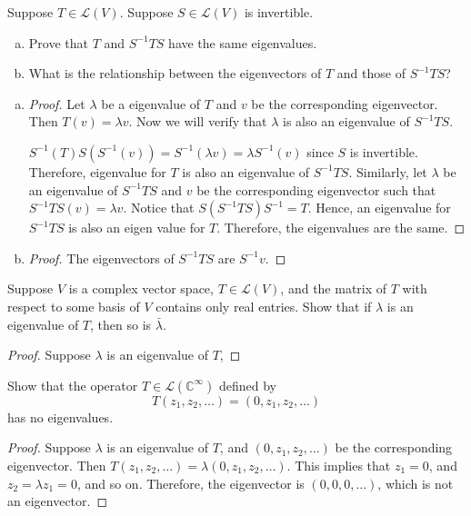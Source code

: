 \begin{exercise}
Suppose $T \in \mathcal{L}(V)$. Suppose $S \in \mathcal{L}(V)$ is invertible.
\begin{enumerate}[(a)]
	\item Prove that $T$ and $S^{-1}TS$ have the same eigenvalues.
	\item What is the relationship between the eigenvectors of $T$ and those of $S^{-1}TS$?
\end{enumerate}
\end{exercise}
\begin{enumerate}[(a)]
	\item \begin{proof}
		      Let $\lambda$ be a eigenvalue of $T$ and $v$ be the corresponding eigenvector. Then $T(v) = \lambda v$. Now we will verify that $\lambda$ is also an eigenvalue of $S^{-1}TS$. \par
		      $S^{-1}(T)S(S^{-1}(v)) = S^{-1}(\lambda v) = \lambda S^{-1}(v)$ since $S$ is invertible. Therefore, eigenvalue for $T$ is also an eigenvalue of $S^{-1}TS$. Similarly, let $\lambda$ be an eigenvalue of $S^{-1}TS$ and $v$ be the corresponding eigenvector such that $S^{-1}TS(v) = \lambda v$. Notice that $S(S^{-1}TS)S^{-1} = T$. Hence, an eigenvalue for $S^{-1}TS$ is also an eigen value for $T$. Therefore, the eigenvalues are the same.
	      \end{proof}
	\item
	      \begin{proof}
		      The eigenvectors of $S^{-1}TS$ are $S^{-1}v$.
	      \end{proof}
\end{enumerate}

\begin{exercise}
Suppose $V$ is a complex vector space, $T \in \mathcal{L}(V)$, and the matrix of $T$ with respect to some basis of $V$ contains only real entries. Show that if $\lambda$ is an eigenvalue of $T$, then so is $\bar{\lambda}$.
\end{exercise}
\begin{proof}
	Suppose $\lambda$ is an eigenvalue of $T$,
\end{proof}

\begin{exercise}
Show that the operator $T \in \mathcal{L}(\mathbb{C}^\infty)$ defined by \[
	T(z_1,z_2, \ldots ) = (0, z_1, z_2, \ldots )\]
has no eigenvalues.
\end{exercise}
\begin{proof}
	Suppose $\lambda$ is an eigenvalue of $T$, and $(0, z_1, z_2, \ldots )$ be the corresponding eigenvector. Then $T(z_1,z_2, \ldots ) = \lambda (0, z_1, z_2, \ldots )$. This implies that $z_1 = 0$, and $z_2 = \lambda z_1 = 0$, and so on. Therefore, the eigenvector is $(0,0,0, \ldots )$, which is not an eigenvector.
\end{proof}

